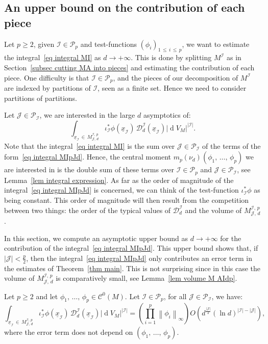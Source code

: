\documentclass[AHL,Unicode,longabstracts,published]{cedram}
\DeclareMathOperator{\dmesure}{d}
\newcommand{\D}{\mathcal{D}}
\newcommand{\I}{\mathcal{I}}
\newcommand{\J}{\mathcal{J}}
\newcommand{\clC}{\mathcal{C}}
\newcommand{\pa}{\mathcal{P}\!}
\newcommand{\norm}[1]{\left\lvert #1 \right\rvert}
\newcommand{\Norm}[1]{\left\lVert #1 \right\rVert}
\newcommand{\rmes}[1]{\norm{\dmesure\! V_{#1}}}
\renewcommand{\geq}{\geqslant}
\renewcommand{\leq}{\leqslant}
\begin{document}
\subsection{An upper bound on the contribution of each piece}\label{subsec an upper bound on the contribution of each piece}

Let $p \geq 2$, given $\I \in \pa_p$ and test-functions $(\phi_i)_{1\,\leq\,i\,\leq\,p}$, we want to estimate the integral~\eqref{eq integral MI} as $d \to +\infty$. This is done by splitting $M^\I$ as in Section~\ref{subsec cutting MA into pieces} and estimating the contribution of each piece. One difficulty is that $\I \in \pa_p$, and the pieces of our decomposition of $M^\I$ are indexed by partitions of $\I$, seen as a finite set. Hence we need to consider partitions of partitions.

Let $\J \in \pa_\I$, we are interested in the large $d$ asymptotics of:
\begin{equation}\label{eq integral MIpJd}
\int_{\underline{x}_\I\,\in\,M^{\I,\,p}_{\J,\,d}} \iota_\I^*\phi\left(\underline{x}_\I\right)\, \D^\I_d\left(\underline{x}_\I\right) \rmes{M}^{\norm{\I}}.
\end{equation}
Note that the integral~\eqref{eq integral MI} is the sum over $\J \in \pa_\I$ of the terms of the form~\eqref{eq integral MIpJd}. Hence, the central moment $m_p(\nu_d)(\phi_1,\,\dots,\,\phi_p)$ we are interested in is the double sum of these terms over $\I \in \pa_p$ and $\J \in \pa_\I$, see Lemma~\ref{lem integral expression}. As far as the order of magnitude of the integral~\eqref{eq integral MIpJd} is concerned, we can think of the test-function $\iota_\I^*\phi$ as being constant. This order of magnitude will then result from the competition between two things: the order of the typical values of $\D_d^\I$ and the volume of $M^{\I,\,p}_{\J,\,d}$.

In this section, we compute an asymptotic upper bound as $d \to +\infty$ for the contribution of the integral~\eqref{eq integral MIpJd}. This upper bound shows that, if $|\J| < \frac{p}{2}$, then the integral~\eqref{eq integral MIpJd} only contributes an error term in the estimates of Theorem~\ref{thm main}. This is not surprising since in this case the volume of $M^{\I,\,p}_{\J,\,d}$ is comparatively small, see Lemma~\ref{lem volume M AIdp}.

\begin{lemm}\label{lem upper bound}
Let $p \geq 2$ and let $\phi_1,\,\dots,\,\phi_p \in \clC^0(M)$. Let $\I \in \pa_p$, for all $\J \in \pa_\I$, we have:
\[
\int_{\underline{x}_\I\,\in\,M^{\I,\,p}_{\J,\,d}} \iota_\I^*\phi\left(\underline{x}_\I\right)\, \D^\I_d\left(\underline{x}_\I\right) \rmes{M}^{\norm{\I}} = \left(\prod_{i=1}^p \Norm{\phi_i}_\infty\right) O\!\left(d^{\frac{\norm{\J}}{2}} (\ln d)^{\norm{\I}-\norm{\J}}\right),
\]
where the error term does not depend on $(\phi_1,\,\dots,\,\phi_p)$.
\end{lemm}
\end{document}
